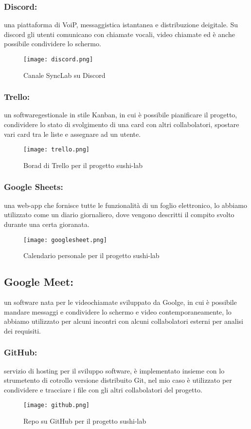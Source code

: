 \subsubsection{Discord:}
una piattaforma di VoiP, messaggistica istantanea e distribuzione deigitale. Su discord gli utenti comunicano con chiamate vocali, video chiamate ed è anche possibile condividere lo schermo.
\begin{figure}[H]
    \centering
    \texttt{[image: discord.png]}
    \caption{Canale SyncLab su Discord}
\end{figure}
\subsubsection{Trello:}
un softwaregestionale in stile Kanban, in cui è possibile pianificare il progetto, condividere lo stato di svolgimento di una card con altri collabolatori, spostare vari card tra le liste e assegnare ad un utente.
\begin{figure}[H]
    \centering
    \texttt{[image: trello.png]}
    \caption{Borad di Trello per il progetto sushi-lab}
\end{figure}
\subsubsection{Google Sheets:}
una web-app che fornisce tutte le funzionalità di un foglio elettronico, lo abbiamo utilizzato come un diario giornaliero, dove vengono descritti il compito svolto durante una certa gioranata.
\begin{figure}[H]
    \centering
    \texttt{[image: googlesheet.png]}
    \caption{Calendario personale per il progetto sushi-lab}
\end{figure}
\subsection{Google Meet:}
un software nata per le videochiamate sviluppato da Goolge, in cui è possibile mandare messaggi e condividere lo schermo e video contemporaneamente, lo abbiamo utilizzato per alcuni incontri con alcuni collabolatori esterni per analisi dei requisiti.
\subsubsection{GitHub:}
servizio di hosting per il sviluppo software, è implementato insieme con lo strumetento di cotrollo versione distribuito Git, nel mio caso è utilizzato per condividere e tracciare i file con gli altri collabolatori del progetto.
\begin{figure}[H]
    \centering
    \texttt{[image: github.png]}
    \caption{Repo su GitHub per il progetto sushi-lab}
\end{figure}
